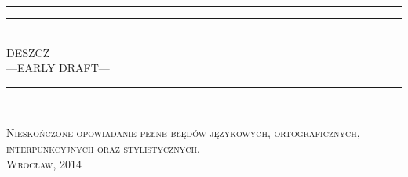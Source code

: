 \documentclass[9pt,openany,titlepage]{extbook}
\begin{document}
	\begin{titlepage}
		\centering
		\vspace*{\baselineskip}
		\rule{\textwidth}{1.6pt}\vspace*{-\baselineskip}\vspace*{2pt}
		\rule{\textwidth}{0.4pt}\\[\baselineskip]{
			\LARGE DESZCZ \\[0.3\baselineskip] ---EARLY DRAFT---
		}\\[0.2\baselineskip]
		\rule{\textwidth}{0.4pt}\vspace*{-\baselineskip}\vspace{3.2pt}
		\rule{\textwidth}{1.6pt}\\[\baselineskip]
		\scshape
		Nieskończone opowiadanie pełne błędów językowych, ortograficznych, \\
		interpunkcyjnych oraz stylistycznych. \\[\baselineskip] 
		\vspace*{2\baselineskip}
		\vfill{\scshape Wrocław, 2014} \\[0.3\baselineskip]
	\end{titlepage}
\end{document}

